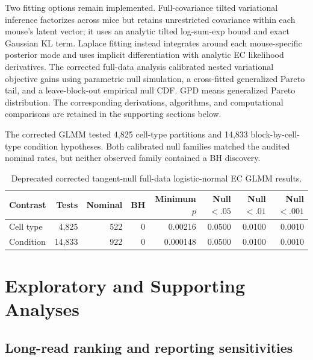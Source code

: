 \documentclass[11pt]{article}
\begin{document}
Two fitting options remain implemented. Full-covariance tilted variational inference factorizes across mice but retains unrestricted covariance within each mouse's latent vector; it uses an analytic tilted log-sum-exp bound and exact Gaussian KL term. Laplace fitting instead integrates around each mouse-specific posterior mode and uses implicit differentiation with analytic EC likelihood derivatives. The corrected full-data analysis calibrated nested variational objective gains using parametric null simulation, a cross-fitted generalized Pareto tail, and a leave-block-out empirical null CDF. GPD means generalized Pareto distribution. The corresponding derivations, algorithms, and computational comparisons are retained in the supporting sections below.

The corrected GLMM tested 4,825 cell-type partitions and 14,833 block-by-cell-type condition hypotheses. Both calibrated null families matched the audited nominal rates, but neither observed family contained a BH discovery.

\begin{table}[H]
\centering
\scriptsize
\caption{Deprecated corrected tangent-null full-data logistic-normal EC GLMM results.}
\label{tab:deprecated-primary-ec-results}
\begin{tabular}{lrrrrrrr}
\toprule
Contrast & Tests & Nominal & BH & Minimum \(p\) & Null $<.05$ & Null $<.01$ & Null $<.001$\\
\midrule
Cell type & 4,825 & 522 & 0 & 0.00216 & 0.0500 & 0.0100 & 0.0010\\
Condition & 14,833 & 922 & 0 & 0.000148 & 0.0500 & 0.0100 & 0.0010\\
\bottomrule
\end{tabular}
\end{table}

\section{Exploratory and Supporting Analyses}

\subsection*{Long-read ranking and reporting sensitivities}
\end{document}
